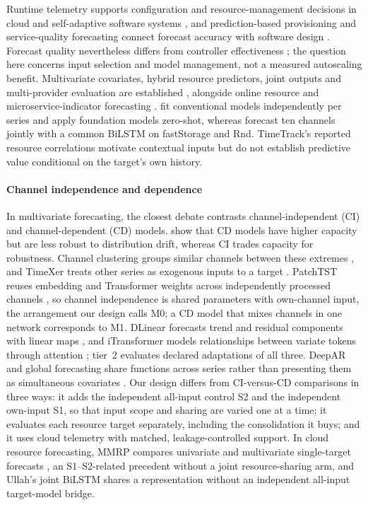 \documentclass[5p,twocolumn]{elsarticle}
\begin{document}
Runtime telemetry supports configuration and resource-management decisions in
cloud and self-adaptive software systems
\citep{Taherizadeh2018Monitoring,Bauer2020SelfAware}, and prediction-based
provisioning and service-quality forecasting connect forecast accuracy with
software design \citep{Calheiros2015ARIMA,Syu2017DynamicQoS}. Forecast quality
nevertheless differs from controller effectiveness \citep{Qu2018Autoscaling};
the question here concerns input selection and model management, not a
measured autoscaling benefit. Multivariate covariates, hybrid resource
predictors, joint outputs and multi-provider evaluation are established
\citep{Tran2018MultivariateFuzzy,Xu2022esDNN,Tripathi2025MMRP,
Rossi2025CloudUncertainty,Zhang2025SWTCLSTM}, alongside online resource and
microservice-indicator forecasting \citep{Gao2026OMCR,Gao2026MaMiClif}.
\citet{DiMenna2026RuntimeForecasting} fit conventional models independently
per series and apply foundation models zero-shot, whereas
\citet{Ullah2023CloudBiLSTM} forecast ten channels jointly with a common
BiLSTM on fastStorage and Rnd. TimeTrack's reported resource correlations
\citep{Meliani2025TimeTrack} motivate contextual inputs but do not establish
predictive value conditional on the target's own history.

\paragraph{Channel independence and dependence} In multivariate forecasting,
the closest debate contrasts channel-independent (CI) and channel-dependent
(CD) models. \citet{Han2024ChannelIndependent} show that CD models have
higher capacity but are less robust to distribution drift, whereas CI trades
capacity for robustness. Channel clustering groups similar channels between
these extremes \citep{Chen2024ChannelClustering}, and TimeXer treats other
series as exogenous inputs to a target \citep{Wang2024TimeXer}. PatchTST
reuses embedding and Transformer weights across independently processed
channels \citep{Nie2023PatchTST}, so channel independence is shared
parameters with own-channel input, the arrangement our design calls M0; a CD
model that mixes channels in one network corresponds to M1. DLinear
forecasts trend and residual components with linear maps
\citep{Zeng2023DLinear}, and iTransformer models relationships between
variate tokens through attention \citep{Liu2024iTransformer}; tier~2
evaluates declared adaptations of all three. DeepAR and global forecasting
share functions across series rather than presenting them as simultaneous
covariates \citep{Salinas2020DeepAR,MonteroManso2021GlobalForecasting}. Our
design differs from CI-versus-CD comparisons in three ways: it adds the
independent all-input control S2 and the independent own-input S1, so that
input scope and sharing are varied one at a time; it evaluates each resource
target separately, including the consolidation it buys; and it uses cloud
telemetry with matched, leakage-controlled support. In cloud resource
forecasting, MMRP compares univariate and multivariate single-target
forecasts \citep{Tripathi2025MMRP}, an S1--S2-related precedent without a
joint resource-sharing arm, and Ullah's joint BiLSTM shares a representation
without an independent all-input target-model bridge.
\end{document}
